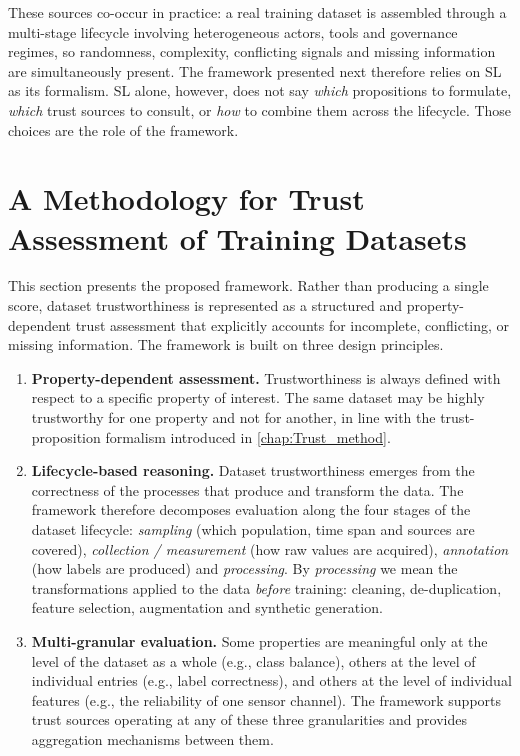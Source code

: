 These sources co-occur in practice: a real training dataset is assembled through a multi-stage lifecycle involving heterogeneous actors, tools and governance regimes, so randomness, complexity, conflicting signals and missing information are simultaneously present. The framework presented next therefore relies on \ac{SL} as its formalism. \ac{SL} alone, however, does not say \emph{which} propositions to formulate, \emph{which} trust sources to consult, or \emph{how} to combine them across the lifecycle. Those choices are the role of the framework.

\section{A Methodology for Trust Assessment of Training Datasets}
\label{sec:dataset-trust:framework}

This section presents the proposed framework. Rather than producing a single score, dataset trustworthiness is represented as a structured and property-dependent trust assessment that explicitly accounts for incomplete, conflicting, or missing information.
\label{sec:dataset-trust:framework:principles}
The framework is built on three design principles.
\begin{enumerate}
  \item \textbf{Property-dependent assessment.} Trustworthiness is always defined with respect to a specific property of interest. The same dataset may be highly trustworthy for one property and not for another, in line with the trust-proposition formalism introduced in \cref{chap:Trust_method}.
  \item \textbf{Lifecycle-based reasoning.} Dataset trustworthiness emerges from the correctness of the processes that produce and transform the data. The framework therefore decomposes evaluation along the four stages of the dataset lifecycle: \emph{sampling} (which population, time span and sources are covered), \emph{collection / measurement} (how raw values are acquired), \emph{annotation} (how labels are produced) and \emph{processing}. By \emph{processing} we mean the transformations applied to the data \emph{before} training: cleaning, de-duplication, feature selection, augmentation and synthetic generation.
  \item \textbf{Multi-granular evaluation.} Some properties are meaningful only at the level of the dataset as a whole (e.g., class balance), others at the level of individual entries (e.g., label correctness), and others at the level of individual features (e.g., the reliability of one sensor channel). The framework supports trust sources operating at any of these three granularities and provides aggregation mechanisms between them.
\end{enumerate}

